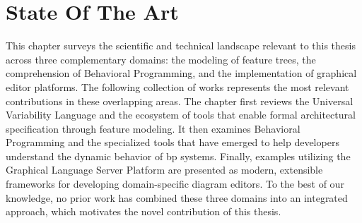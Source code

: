 \chapter{State Of The Art}
\label{chapter:state_of_the_art}

This chapter surveys the scientific and technical landscape relevant to this thesis across three complementary domains: the modeling of feature trees, the comprehension of Behavioral Programming, and the implementation of graphical editor platforms.
The following collection of works represents the most relevant contributions in these overlapping areas.
The chapter first reviews the Universal Variability Language and the ecosystem of tools that enable formal architectural specification through feature modeling.
It then examines Behavioral Programming and the specialized tools that have emerged to help developers understand the dynamic behavior of \gls{bp} systems.
Finally, examples utilizing the Graphical Language Server Platform are presented as modern, extensible frameworks for developing domain-specific diagram editors.
To the best of our knowledge, no prior work has combined these three domains into an integrated approach, which motivates the novel contribution of this thesis.







